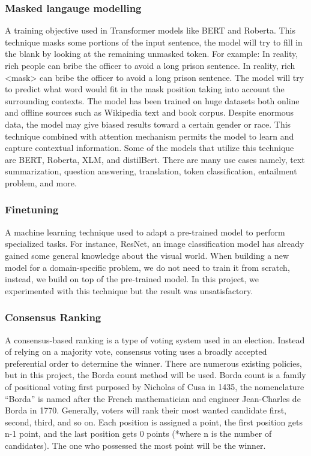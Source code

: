 \documentclass[12pt,oneside,openright,a4paper]{cpe-english-project}
\begin{document}
\subsubsection{Masked langauge modelling}
A training objective used in Transformer models like BERT and Roberta. This technique masks some portions of the input sentence, the model will try to fill in the blank by looking at the remaining unmasked token. For example: 
In reality, rich people can bribe the officer to avoid a long prison sentence.
In reality, rich <mask> can bribe the officer to avoid a long prison sentence.
The model will try to predict what word would fit in the mask position taking into account the surrounding contexts. The model has been trained on huge datasets both online and offline sources such as Wikipedia text and book corpus. Despite enormous data, the model may give biased results toward a certain gender or race.
This technique combined with attention mechanism permits the model to learn and capture contextual information. Some of the models that utilize this technique are BERT, Roberta, XLM, and distilBert. There are many use cases namely, text summarization, question answering, translation, token classification, entailment problem, and more.


\subsubsection{Finetuning}
A machine learning technique used to adapt a pre-trained model to perform specialized tasks. For instance, ResNet, an image classification model has already gained some general knowledge about the visual world. When building a new model for a domain-specific problem, we do not need to train it from scratch, instead, we build on top of the pre-trained model. In this project, we experimented with this technique but the result was unsatisfactory. 

\subsubsection{Consensus Ranking}
A consensus-based ranking is a type of voting system used in an election. Instead of relying on a majority vote, consensus voting uses a broadly accepted preferential order to determine the winner. There are numerous existing policies, but in this project, the Borda count method will be used. Borda count is a family of positional voting first purposed by Nicholas of Cusa in 1435, the nomenclature “Borda” is named after the French mathematician and engineer Jean-Charles de Borda in 1770. Generally, voters will rank their most wanted candidate first, second, third, and so on. Each position is assigned a point, the first position gets n-1 point, and the last position gets 0 points (*where n is the number of candidates). The one who possessed the most point will be the winner. 
\end{document}
